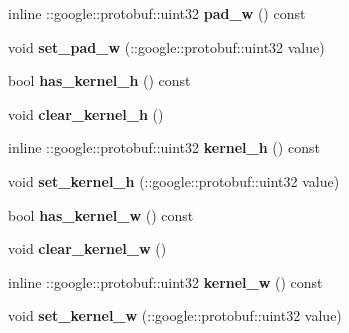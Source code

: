 \begin{DoxyCompactItemize}
inline \+::google\+::protobuf\+::uint32 {\bfseries pad\+\_\+w} () const
\item 
\mbox{\label{classcaffe_1_1_convolution_parameter_a314eea9a18b80ba7c766e5b0b72372b8}} 
void {\bfseries set\+\_\+pad\+\_\+w} (\+::google\+::protobuf\+::uint32 value)
\item 
\mbox{\label{classcaffe_1_1_convolution_parameter_af756f02efc4e4ffca2a63306a1a28143}} 
bool {\bfseries has\+\_\+kernel\+\_\+h} () const
\item 
\mbox{\label{classcaffe_1_1_convolution_parameter_a4b4ad9eeec7e46fa0bdbee715bb6da94}} 
void {\bfseries clear\+\_\+kernel\+\_\+h} ()
\item 
\mbox{\label{classcaffe_1_1_convolution_parameter_ab54e03d1473405f4b0c4eefeea5da465}} 
inline \+::google\+::protobuf\+::uint32 {\bfseries kernel\+\_\+h} () const
\item 
\mbox{\label{classcaffe_1_1_convolution_parameter_a0e7b3380d66b53aad4d23e6a6379ace7}} 
void {\bfseries set\+\_\+kernel\+\_\+h} (\+::google\+::protobuf\+::uint32 value)
\item 
\mbox{\label{classcaffe_1_1_convolution_parameter_a173f4bc2346fd13118208ffcb38ea5c0}} 
bool {\bfseries has\+\_\+kernel\+\_\+w} () const
\item 
\mbox{\label{classcaffe_1_1_convolution_parameter_a477634f61f7fbd7cddb46fc4b5b171d9}} 
void {\bfseries clear\+\_\+kernel\+\_\+w} ()
\item 
\mbox{\label{classcaffe_1_1_convolution_parameter_aec0e0581c2f48d64dcf17e4be74ee5ca}} 
inline \+::google\+::protobuf\+::uint32 {\bfseries kernel\+\_\+w} () const
\item 
\mbox{\label{classcaffe_1_1_convolution_parameter_ade17c571b416ae180aaa66ed93e09c49}} 
void {\bfseries set\+\_\+kernel\+\_\+w} (\+::google\+::protobuf\+::uint32 value)

\end{DoxyCompactItemize}
